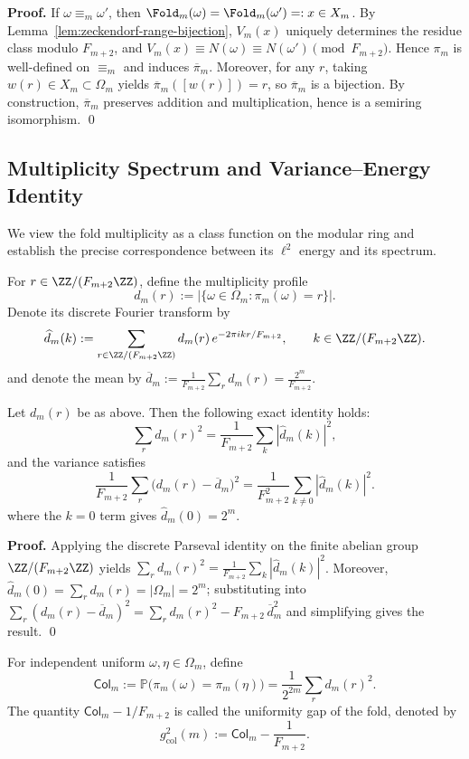\textbf{Proof.}
If $\omega\equiv_m\omega'$, then $\Fold_m(\omega)=\Fold_m(\omega')=:x\in X_m$.
By Lemma~\ref{lem:zeckendorf-range-bijection}, $V_m(x)$ uniquely determines the residue class modulo $F_{m+2}$, and
\(V_m(x)\equiv N(\omega)\equiv N(\omega')\pmod{F_{m+2}}\).
Hence $\pi_m$ is well-defined on $\equiv_m$ and induces $\overline\pi_m$. Moreover, for any $r$, taking $w(r)\in X_m\subset\Omega_m$ yields
\(\overline\pi_m([w(r)])=r\), so $\overline\pi_m$ is a bijection. By construction, $\overline\pi_m$ preserves addition and multiplication, hence is a semiring isomorphism. \qed

\subsection{Multiplicity Spectrum and Variance--Energy Identity}
We view the fold multiplicity as a class function on the modular ring and establish the precise correspondence between its $\ell^2$ energy and its spectrum.

\begin{definition}
For $r\in\ZZ/(F_{m+2}\ZZ)$, define the multiplicity profile
\[
d_m(r):=\bigl|\{\omega\in\Omega_m:\pi_m(\omega)=r\}\bigr|.
\]
Denote its discrete Fourier transform by
\[
\widehat d_m(k):=\sum_{r\in\ZZ/(F_{m+2}\ZZ)} d_m(r)\,e^{-2\pi i kr/F_{m+2}},
\qquad k\in\ZZ/(F_{m+2}\ZZ).
\]
and denote the mean by
\(
\overline d_m:=\frac{1}{F_{m+2}}\sum_r d_m(r)=\frac{2^m}{F_{m+2}}.
\)
\end{definition}

\begin{theorem}
\label{thm:fold-multiplicity-energy}
Let $d_m(r)$ be as above. Then the following exact identity holds:
\[
\sum_{r} d_m(r)^2=\frac{1}{F_{m+2}}\sum_{k}|\widehat d_m(k)|^2,
\]
and the variance satisfies
\[
\frac{1}{F_{m+2}}\sum_r\bigl(d_m(r)-\overline d_m\bigr)^2
=\frac{1}{F_{m+2}^2}\sum_{k\ne 0}|\widehat d_m(k)|^2.
\]
where the $k=0$ term gives $\widehat d_m(0)=2^m$.
\end{theorem}

\textbf{Proof.}
Applying the discrete Parseval identity on the finite abelian group $\ZZ/(F_{m+2}\ZZ)$ yields
\(
\sum_r d_m(r)^2=\frac{1}{F_{m+2}}\sum_k|\widehat d_m(k)|^2
\).
Moreover, $\widehat d_m(0)=\sum_r d_m(r)=|\Omega_m|=2^m$; substituting into
\(
\sum_r(d_m(r)-\overline d_m)^2=\sum_r d_m(r)^2-F_{m+2}\,\overline d_m^2
\)
and simplifying gives the result. \qed

\begin{definition}
For independent uniform $\omega,\eta\in\Omega_m$, define
\[
\mathsf{Col}_m:=\mathbb{P}\bigl(\pi_m(\omega)=\pi_m(\eta)\bigr)
=\frac{1}{2^{2m}}\sum_r d_m(r)^2.
\]
The quantity $\mathsf{Col}_m-1/F_{m+2}$ is called the uniformity gap of the fold, denoted by
\[
g_{\mathrm{col}}^2(m):=\mathsf{Col}_m-\frac{1}{F_{m+2}}.
\]
\end{definition}


